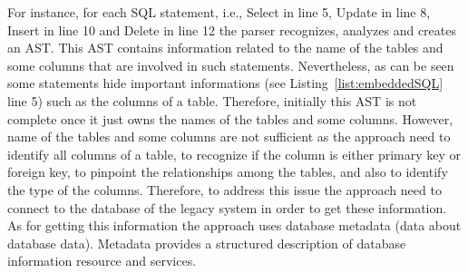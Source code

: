 \documentclass[a4paper,twoside]{article}
\begin{document}
For instance, for each SQL statement, i.e., Select in line 5, Update in line 8, Insert in line 10 and Delete in line 12 the parser recognizes, analyzes and creates an AST. This AST contains information related to the name of the tables and some columns that are involved in such statements. Nevertheless, as can be seen some statements hide important informations (see Listing~\ref{list:embeddedSQL} line 5) such as the columns of a table. Therefore, initially this AST is not complete once it just owns the names of the tables and some columns. However, name of the tables and some columns are not sufficient as the approach need to identify all columns of a table, to recognize if the column is either primary key or foreign key, to pinpoint the relationships among the tables, and also to identify the type of the columns. Therefore, to address this issue the approach need to connect to the database of the legacy system in order to get these information.  As for getting this information the approach uses database metadata (data about database data). Metadata provides a structured description of database information resource and services.











\end{document}
